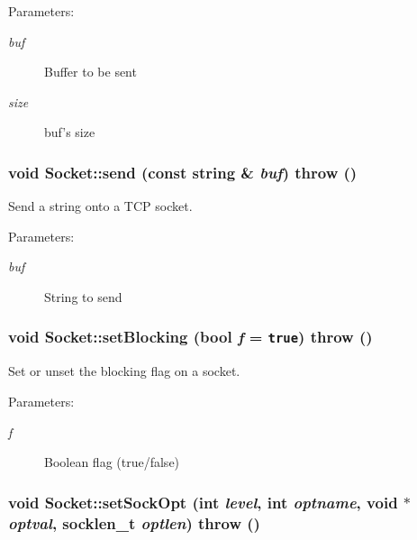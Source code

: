 \begin{Desc}
\item[Parameters:]
\begin{description}
\item[{\em buf}]Buffer to be sent \item[{\em size}]buf's size \end{description}
\end{Desc}
\hypertarget{classSocket_58193259e85351165b60e6cad9e8e1ac}{
\subsubsection[{send}]{\setlength{\rightskip}{0pt plus 5cm}void Socket::send (const string \& {\em buf})  throw ()}}
\label{classSocket_58193259e85351165b60e6cad9e8e1ac}


Send a string onto a TCP socket. 

\begin{Desc}
\item[Parameters:]
\begin{description}
\item[{\em buf}]String to send \end{description}
\end{Desc}
\hypertarget{classSocket_cb7309a2f56ab9ed7769dccb39178200}{
\subsubsection[{setBlocking}]{\setlength{\rightskip}{0pt plus 5cm}void Socket::setBlocking (bool {\em f} = {\tt true})  throw ()}}
\label{classSocket_cb7309a2f56ab9ed7769dccb39178200}


Set or unset the blocking flag on a socket. 

\begin{Desc}
\item[Parameters:]
\begin{description}
\item[{\em f}]Boolean flag (true/false) \end{description}
\end{Desc}
\hypertarget{classSocket_5930d6cd7bc34b6de1126b80aad7bedd}{
\subsubsection[{setSockOpt}]{\setlength{\rightskip}{0pt plus 5cm}void Socket::setSockOpt (int {\em level}, \/  int {\em optname}, \/  void $\ast$ {\em optval}, \/  socklen\_\-t {\em optlen})  throw ()}}
\label{classSocket_5930d6cd7bc34b6de1126b80aad7bedd}


